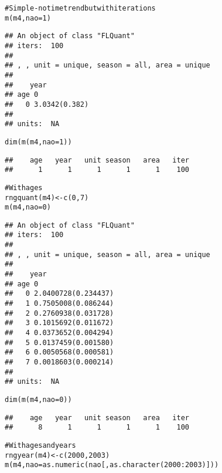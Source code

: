 \documentclass[a4paper,english,10pt]{article}\usepackage[]{graphicx}\usepackage[]{color}
\makeatletter
\newcommand{\hlnum}[1]{\textcolor[rgb]{0.2,0.2,0.2}{#1}}%
\newcommand{\hlcom}[1]{\textcolor[rgb]{0.2,0.267,0.4}{#1}}%
\newcommand{\hlopt}[1]{\textcolor[rgb]{0.2,0.2,0.2}{#1}}%
\newcommand{\hlstd}[1]{\textcolor[rgb]{0,0,0}{#1}}%
\newcommand{\hlkwb}[1]{\textcolor[rgb]{0.361,0.506,0.596}{#1}}%
\newcommand{\hlkwc}[1]{\textcolor[rgb]{0.361,0.506,0.596}{#1}}%
\newcommand{\hlkwd}[1]{\textcolor[rgb]{0.361,0.506,0.596}{#1}}%
\newenvironment{kframe}{%
 \def\at@end@of@kframe{}%
 \ifinner\ifhmode%
  \def\at@end@of@kframe{\end{minipage}}%
  \begin{minipage}{\columnwidth}%
 \fi\fi%
 \def\FrameCommand##1{\hskip\@totalleftmargin \hskip-\fboxsep
 \colorbox{shadecolor}{##1}\hskip-\fboxsep
     \hskip-\linewidth \hskip-\@totalleftmargin \hskip\columnwidth}%
 \MakeFramed {\advance\hsize-\width
   \@totalleftmargin\z@ \linewidth\hsize
   \@setminipage}}%
 {\par\unskip\endMakeFramed%
 \at@end@of@kframe}
\newenvironment{knitrout}{}{} %
\makeatother
\begin{document}
\begin{knitrout}
\color{fgcolor}\begin{kframe}
\begin{alltt}
\hlcom{# Simple - no time trend but with iterations}
\hlkwd{m}\hlstd{(m4,} \hlkwc{nao}\hlstd{=}\hlnum{1}\hlstd{)}
\end{alltt}
\begin{verbatim}
## An object of class "FLQuant"
## iters:  100 
## 
## , , unit = unique, season = all, area = unique
## 
##    year
## age 0            
##   0 3.0342(0.382)
## 
## units:  NA
\end{verbatim}
\begin{alltt}
\hlkwd{dim}\hlstd{(}\hlkwd{m}\hlstd{(m4,} \hlkwc{nao}\hlstd{=}\hlnum{1}\hlstd{))}
\end{alltt}
\begin{verbatim}
##    age   year   unit season   area   iter 
##      1      1      1      1      1    100
\end{verbatim}
\begin{alltt}
\hlcom{# With ages}
\hlkwd{rngquant}\hlstd{(m4)} \hlkwb{<-} \hlkwd{c}\hlstd{(}\hlnum{0}\hlstd{,}\hlnum{7}\hlstd{)}
\hlkwd{m}\hlstd{(m4,} \hlkwc{nao}\hlstd{=}\hlnum{0}\hlstd{)}
\end{alltt}
\begin{verbatim}
## An object of class "FLQuant"
## iters:  100 
## 
## , , unit = unique, season = all, area = unique
## 
##    year
## age 0                  
##   0 2.0400728(0.234437)
##   1 0.7505008(0.086244)
##   2 0.2760938(0.031728)
##   3 0.1015692(0.011672)
##   4 0.0373652(0.004294)
##   5 0.0137459(0.001580)
##   6 0.0050568(0.000581)
##   7 0.0018603(0.000214)
## 
## units:  NA
\end{verbatim}
\begin{alltt}
\hlkwd{dim}\hlstd{(}\hlkwd{m}\hlstd{(m4,} \hlkwc{nao}\hlstd{=}\hlnum{0}\hlstd{))}
\end{alltt}
\begin{verbatim}
##    age   year   unit season   area   iter 
##      8      1      1      1      1    100
\end{verbatim}
\begin{alltt}
\hlcom{# With ages and years}
\hlkwd{rngyear}\hlstd{(m4)} \hlkwb{<-} \hlkwd{c}\hlstd{(}\hlnum{2000}\hlstd{,} \hlnum{2003}\hlstd{)}
\hlkwd{m}\hlstd{(m4,} \hlkwc{nao}\hlstd{=}\hlkwd{as.numeric}\hlstd{(nao[,}\hlkwd{as.character}\hlstd{(}\hlnum{2000}\hlopt{:}\hlnum{2003}\hlstd{)]))}
\end{alltt}

\end{kframe}
\end{knitrout}
\end{document}
